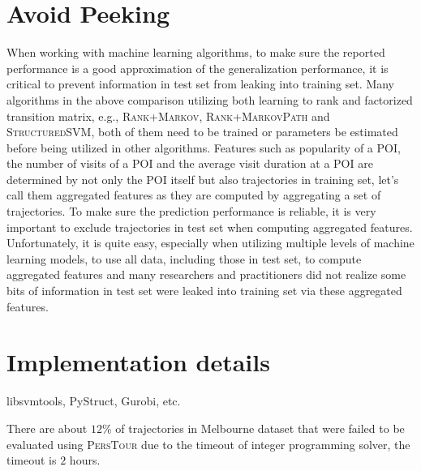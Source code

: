 \section{Avoid Peeking}
When working with machine learning algorithms, to make sure the reported performance is a good approximation
of the generalization performance, it is critical to prevent information in test set from leaking into
training set.
Many algorithms in the above comparison utilizing both learning to rank and factorized transition matrix,
e.g., \textsc{Rank+Markov}, \textsc{Rank+MarkovPath} and \textsc{StructuredSVM},
both of them need to be trained or parameters be estimated before being utilized in other algorithms.
Features such as popularity of a POI, the number of visits of a POI and the average visit duration at a POI are
determined by not only the POI itself but also trajectories in training set, let's call them aggregated features as they are
computed by aggregating a set of trajectories.
To make sure the prediction performance is reliable, it is very important to exclude trajectories in test set
when computing aggregated features.
Unfortunately, it is quite easy, especially when utilizing multiple levels of machine learning models,
to use all data, including those in test set, to compute aggregated features and many researchers and
practitioners did not realize some bits of information in test set were leaked into training set via these aggregated features.


\section{Implementation details}
libsvmtools, PyStruct, Gurobi, etc.

There are about $12$\% of trajectories in Melbourne dataset that were failed to be evaluated
using \textsc{PersTour} due to the timeout of integer programming solver, the timeout is $2$ hours.
